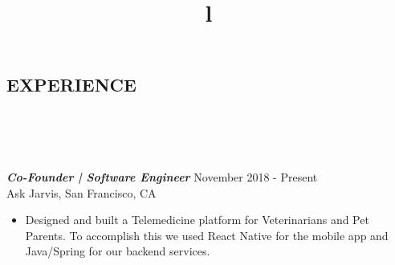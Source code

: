 \documentclass[overlapped, 10pt]{res} %
\begin{document}
\begin{resume}

 



\section{EXPERIENCE}\smallskip 

\begin{format}
\title{l}\\
\\
\body\\
\end{format}


{\sl \textbf{Co-Founder | Software Engineer}} \hfill November 2018 - Present \\
Ask Jarvis, San Francisco, CA
\begin{itemize} \itemsep -1pt %
\item Designed and built a Telemedicine platform for Veterinarians and Pet Parents. To accomplish this we used React Native for the mobile app and Java/Spring for our backend services.
\end{itemize}


\end{resume}
\end{document}
